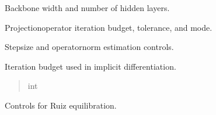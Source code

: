 \documentclass[letterpaper,10pt,english,openany,oneside]{sphinxmanual}
\begin{document}
\begin{fulllineitems}
\begin{fulllineitems}

\pysigstartsignatures
{}
\pysigstopsignatures
\sphinxAtStartPar
Backbone width and number of hidden layers.

\end{fulllineitems}



\begin{fulllineitems}

\pysigstartsignatures
{}
\pysigstopsignatures
\sphinxAtStartPar
Projection\sphinxhyphen{}operator iteration budget, tolerance, and mode.

\end{fulllineitems}



\begin{fulllineitems}

\pysigstartsignatures
{}
\pysigstopsignatures
\sphinxAtStartPar
Step\sphinxhyphen{}size and operator\sphinxhyphen{}norm estimation controls.

\end{fulllineitems}


\begin{fulllineitems}
\label{\detokenize{api/package/hyperparameters:opt.training.config.TrainConfig.adjoint_iters}}
\pysigstartsignatures
{}
\pysigstopsignatures
\sphinxAtStartPar
Iteration budget used in implicit differentiation.
\begin{quote}\begin{description}
\sphinxAtStartPar
int

\end{description}\end{quote}

\end{fulllineitems}



\begin{fulllineitems}

\pysigstartsignatures
{}
\pysigstopsignatures
\sphinxAtStartPar
Controls for Ruiz equilibration.


\end{fulllineitems}
\end{fulllineitems}
\end{document}
